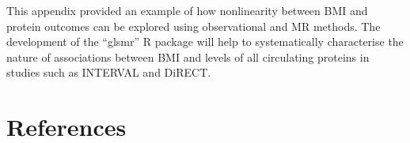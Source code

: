 \documentclass[11pt,twoside]{bristolthesis}
\begin{document}
This appendix provided an example of how nonlinearity between BMI and protein outcomes can be explored using observational and MR methods. The development of the ``glsmr'' R package will help to systematically characterise the nature of associations between BMI and levels of all circulating proteins in studies such as INTERVAL and DiRECT.

\backmatter

\hypertarget{references}{%
\chapter*{References}\label{references}}


\noindent

\setlength{\parindent}{-0.20in}
\setlength{\leftskip}{0.20in}
\setlength{\parskip}{8pt}
\end{document}
